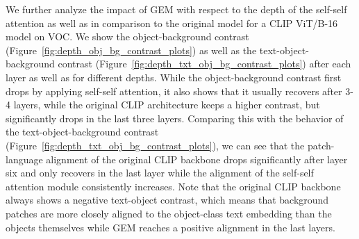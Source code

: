 \documentclass[10pt,twocolumn,letterpaper]{article}
\begin{document}
We further analyze the impact of GEM with respect to the depth of the self-self attention as well as in comparison to the original model for a CLIP ViT/B-16 model on VOC. 
We show the object-background contrast (Figure~\ref{fig:depth_obj_bg_contrast_plots}) as well as the text-object-background contrast (Figure~\ref{fig:depth_txt_obj_bg_contrast_plots}) after each layer as well as for different depths. 
While the object-background contrast first drops by applying self-self attention, it also shows that it usually recovers after 3-4 layers, while the original CLIP architecture keeps a higher contrast, but significantly drops in the last three layers. 
Comparing this with the behavior of the text-object-background contrast (Figure~\ref{fig:depth_txt_obj_bg_contrast_plots}), we can see that the patch-language alignment of the original CLIP backbone drops significantly after layer six and only recovers in the last layer while the alignment of the self-self attention module consistently increases. Note that the original CLIP backbone always shows a negative text-object contrast, which means that background patches are more closely aligned to the object-class text embedding than the objects themselves while GEM reaches a positive alignment in the last layers.  
  
\end{document}
